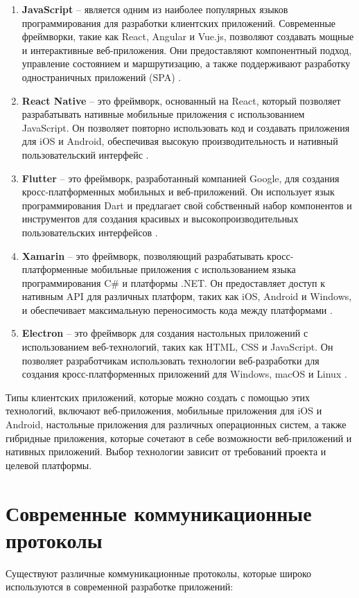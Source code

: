 \begin{enumerate}
    \item \textbf{JavaScript} -- является одним из наиболее популярных языков программирования для разработки клиентских приложений. 
    Современные фреймворки, такие как React, Angular и Vue.js, 
    позволяют создавать мощные и интерактивные веб-приложения. 
    Они предоставляют компонентный подход, управление состоянием и маршрутизацию, 
    а также поддерживают разработку одностраничных приложений (SPA) \cite{LearnJavaScript}.
    \item \textbf{React Native} -- это фреймворк, основанный на React, 
    который позволяет разрабатывать нативные мобильные приложения 
    с использованием JavaScript. Он позволяет повторно использовать код и создавать приложения для iOS и Android, 
    обеспечивая высокую производительность и нативный пользовательский интерфейс \cite{ReactNative}.
    \item \textbf{Flutter} -- это фреймворк, разработанный компанией Google, для создания 
    кросс-платформенных мобильных и веб-приложений. 
    Он использует язык программирования Dart и предлагает свой собственный набор компонентов 
    и инструментов для создания красивых и высокопроизводительных пользовательских интерфейсов \cite{Flutter}.
    \item \textbf{Xamarin} -- это фреймворк, позволяющий разрабатывать кросс-платформенные мобильные приложения 
    с использованием языка программирования C\# и платформы .NET. 
    Он предоставляет доступ к нативным API для различных платформ, таких как iOS, Android и Windows, 
    и обеспечивает максимальную переносимость кода между платформами \cite{Xamarin}.
    \item \textbf{Electron} -- это фреймворк для создания настольных приложений с использованием веб-технологий, таких как HTML, 
    CSS и JavaScript. Он позволяет разработчикам использовать технологии веб-разработки 
    для создания кросс-платформенных приложений для Windows, macOS и Linux \cite{Electronjs}.
\end{enumerate}

Типы клиентских приложений, которые можно создать с помощью этих технологий, 
включают веб-приложения, мобильные приложения для iOS и Android, настольные приложения для различных операционных систем, 
а также гибридные приложения, которые сочетают в себе возможности веб-приложений и 
нативных приложений. Выбор технологии зависит от требований проекта и
целевой платформы.

\section{Современные коммуникационные протоколы}
Существуют различные коммуникационные протоколы, которые широко используются в современной разработке приложений:

